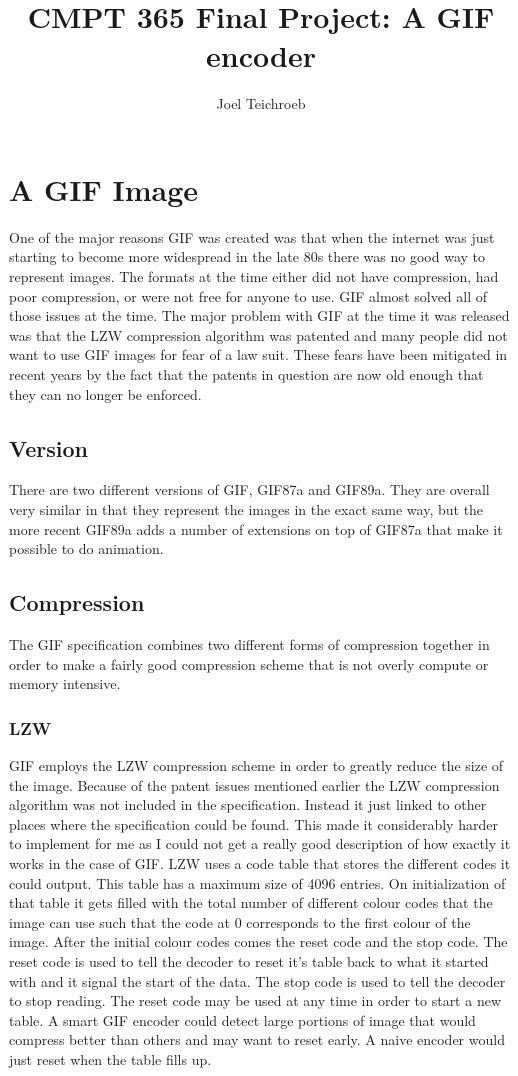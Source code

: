 \documentclass[11pt]{article} %
\title{CMPT 365 Final Project: A GIF encoder}
\author{Joel Teichroeb}
\begin{document}
\maketitle

\section{A GIF Image}
One of the major reasons GIF was created was that when the internet was just starting to become more widespread in the late 80s there was no good way to represent images. The formats at the time either did not have compression, had poor compression, or were not free for anyone to use. GIF almost solved all of those issues at the time. The major problem with GIF at the time it was released was that the LZW compression algorithm was patented and many people did not want to use GIF images for fear of a law suit. These fears have been mitigated in recent years by the fact that the patents in question are now old enough that they can no longer be enforced.
\subsection{Version}
There are two different versions of GIF, GIF87a and GIF89a. They are overall very similar in that they represent the images in the exact same way, but the more recent GIF89a adds a number of extensions on top of GIF87a that make it possible to do animation.
\subsection{Compression}
The GIF specification combines two different forms of compression together in order to make a fairly good compression scheme that is not overly compute or memory intensive.
\subsubsection{LZW}
GIF employs the LZW compression scheme in order to greatly reduce the size of the image. Because of the patent issues mentioned earlier the LZW compression algorithm was not included in the specification. Instead it just linked to other places where the specification could be found. This made it considerably harder to implement for me as I could not get a really good description of how exactly it works in the case of GIF. LZW uses a code table that stores the different codes it could output. This table has a maximum size of 4096 entries. On initialization of that table it gets filled with the total number of different colour codes that the image can use such that the code at 0 corresponds to the first colour of the image. After the initial colour codes comes the reset code and the stop code. The reset code is used to tell the decoder to reset it's table back to what it started with and it signal the start of the data. The stop code is used to tell the decoder to stop reading. The reset code may be used at any time in order to start a new table. A smart GIF encoder could detect large portions of image that would compress better than others and may want to reset early. A naive encoder would just reset when the table fills up.
\end{document}
